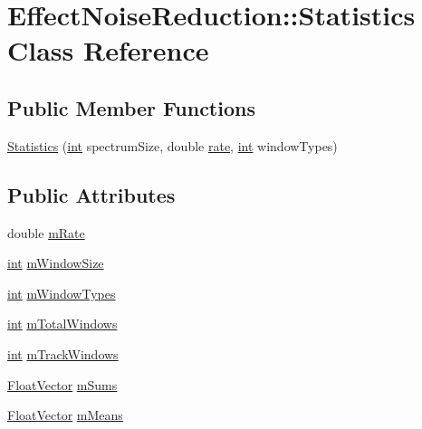 \hypertarget{class_effect_noise_reduction_1_1_statistics}{}\section{Effect\+Noise\+Reduction\+:\+:Statistics Class Reference}
\label{class_effect_noise_reduction_1_1_statistics}
\subsection*{Public Member Functions}
\begin{DoxyCompactItemize}
\item 
\hyperlink{class_effect_noise_reduction_1_1_statistics_aca7498c18e76448e04af858740d9595b}{Statistics} (\hyperlink{xmltok_8h_a5a0d4a5641ce434f1d23533f2b2e6653}{int} spectrum\+Size, double \hyperlink{seqread_8c_ad89d3fac2deab7a9cf6cfc8d15341b85}{rate}, \hyperlink{xmltok_8h_a5a0d4a5641ce434f1d23533f2b2e6653}{int} window\+Types)
\end{DoxyCompactItemize}
\subsection*{Public Attributes}
\begin{DoxyCompactItemize}
\item 
double \hyperlink{class_effect_noise_reduction_1_1_statistics_a291421ba2374bc0523e69ae9c4d552bf}{m\+Rate}
\item 
\hyperlink{xmltok_8h_a5a0d4a5641ce434f1d23533f2b2e6653}{int} \hyperlink{class_effect_noise_reduction_1_1_statistics_a827ea087481e17d97852a85d94f43d6f}{m\+Window\+Size}
\item 
\hyperlink{xmltok_8h_a5a0d4a5641ce434f1d23533f2b2e6653}{int} \hyperlink{class_effect_noise_reduction_1_1_statistics_af8ae2e3c045af22ce970cb3827209050}{m\+Window\+Types}
\item 
\hyperlink{xmltok_8h_a5a0d4a5641ce434f1d23533f2b2e6653}{int} \hyperlink{class_effect_noise_reduction_1_1_statistics_ab17125778a20ce16b8a8bd13b21cfdc3}{m\+Total\+Windows}
\item 
\hyperlink{xmltok_8h_a5a0d4a5641ce434f1d23533f2b2e6653}{int} \hyperlink{class_effect_noise_reduction_1_1_statistics_adc7ddfa5b3c6d2cf88553e597d6e687f}{m\+Track\+Windows}
\item 
\hyperlink{_noise_reduction_8cpp_a64be07a13efb96ba9d376c4cbc6f501e}{Float\+Vector} \hyperlink{class_effect_noise_reduction_1_1_statistics_af81af8f27eba423cc134bd9b94b7019e}{m\+Sums}
\item 
\hyperlink{_noise_reduction_8cpp_a64be07a13efb96ba9d376c4cbc6f501e}{Float\+Vector} \hyperlink{class_effect_noise_reduction_1_1_statistics_a8eef84dd0517967f9ef56ed907068ece}{m\+Means}
\end{DoxyCompactItemize}


